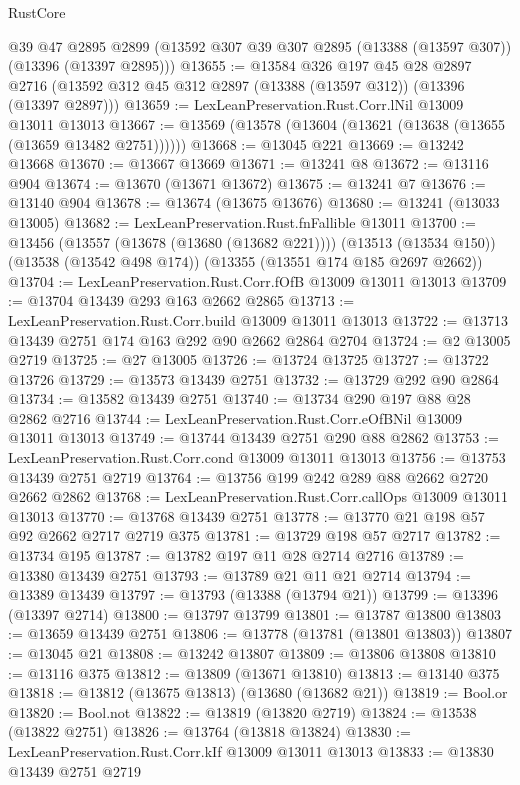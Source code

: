 \begin{lexlean}{RustCore}
\begin{coremodule}
    @39
    @47
    @2895
    @2899
    (@13592 @307 @39 @307 @2895 (@13388 (@13597 @307)) (@13396 (@13397 @2895)))
@13655 := @13584
    @326
    @197
    @45
    @28
    @2897
    @2716
    (@13592 @312 @45 @312 @2897 (@13388 (@13597 @312)) (@13396 (@13397 @2897)))
@13659 := LexLeanPreservation.Rust.Corr.lNil @13009 @13011 @13013
@13667 := @13569 (@13578 (@13604 (@13621 (@13638 (@13655 (@13659 @13482 @2751))))))
@13668 := @13045 @221
@13669 := @13242 @13668
@13670 := @13667 @13669
@13671 := @13241 @8
@13672 := @13116 @904
@13674 := @13670 (@13671 @13672)
@13675 := @13241 @7
@13676 := @13140 @904
@13678 := @13674 (@13675 @13676)
@13680 := @13241 (@13033 @13005)
@13682 := LexLeanPreservation.Rust.fnFallible @13011
@13700 := @13456
    (@13557 (@13678 (@13680 (@13682 @221))))
    (@13513 (@13534 @150))
    (@13538 (@13542 @498 @174))
    (@13355 (@13551 @174 @185 @2697 @2662))
@13704 := LexLeanPreservation.Rust.Corr.fOfB @13009 @13011 @13013
@13709 := @13704 @13439 @293 @163 @2662 @2865
@13713 := LexLeanPreservation.Rust.Corr.build @13009 @13011 @13013
@13722 := @13713 @13439 @2751 @174 @163 @292 @90 @2662 @2864 @2704
@13724 := @2 @13005 @2719
@13725 := @27 @13005
@13726 := @13724 @13725
@13727 := @13722 @13726
@13729 := @13573 @13439 @2751
@13732 := @13729 @292 @90 @2864
@13734 := @13582 @13439 @2751
@13740 := @13734 @290 @197 @88 @28 @2862 @2716
@13744 := LexLeanPreservation.Rust.Corr.eOfBNil @13009 @13011 @13013
@13749 := @13744 @13439 @2751 @290 @88 @2862
@13753 := LexLeanPreservation.Rust.Corr.cond @13009 @13011 @13013
@13756 := @13753 @13439 @2751 @2719
@13764 := @13756 @199 @242 @289 @88 @2662 @2720 @2662 @2862
@13768 := LexLeanPreservation.Rust.Corr.callOps @13009 @13011 @13013
@13770 := @13768 @13439 @2751
@13778 := @13770 @21 @198 @57 @92 @2662 @2717 @2719 @375
@13781 := @13729 @198 @57 @2717
@13782 := @13734 @195
@13787 := @13782 @197 @11 @28 @2714 @2716
@13789 := @13380 @13439 @2751
@13793 := @13789 @21 @11 @21 @2714
@13794 := @13389 @13439
@13797 := @13793 (@13388 (@13794 @21))
@13799 := @13396 (@13397 @2714)
@13800 := @13797 @13799
@13801 := @13787 @13800
@13803 := @13659 @13439 @2751
@13806 := @13778 (@13781 (@13801 @13803))
@13807 := @13045 @21
@13808 := @13242 @13807
@13809 := @13806 @13808
@13810 := @13116 @375
@13812 := @13809 (@13671 @13810)
@13813 := @13140 @375
@13818 := @13812 (@13675 @13813) (@13680 (@13682 @21))
@13819 := Bool.or
@13820 := Bool.not
@13822 := @13819 (@13820 @2719)
@13824 := @13538 (@13822 @2751)
@13826 := @13764 (@13818 @13824)
@13830 := LexLeanPreservation.Rust.Corr.kIf @13009 @13011 @13013
@13833 := @13830 @13439 @2751 @2719

\end{coremodule}
\end{lexlean}
